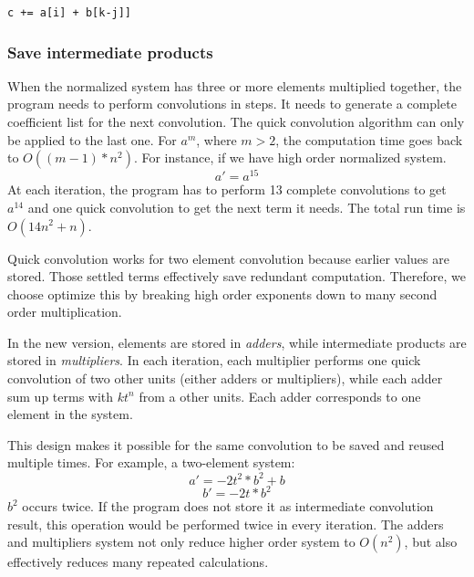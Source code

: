 \documentclass[12pt]{article}
\begin{document}
\begin{algorithmic}
   \State \texttt{c += a[i] + b[k-j]]}
\EndFor
\end{algorithmic}

\subsubsection{Save intermediate products}
When the normalized system has three or more elements multiplied together, the program needs to perform convolutions in steps. It needs to generate a complete coefficient list for the next convolution. The quick convolution algorithm can only be applied to the last one. For $a^{m}$, where $m>2$, the computation time goes back to $O((m-1)*n^2)$.
For instance, if we have high order normalized system.
\begin{equation}
a' = a^{15}
\end{equation}
At each iteration, the program has to perform 13 complete convolutions to get $a^{14}$ and one quick convolution to get the next term it needs. The total run time is $O(14n^{2}+n)$.

Quick convolution works for two element convolution because earlier values are stored. Those settled terms effectively save redundant computation. Therefore, we choose optimize this by breaking high order exponents down to many second order multiplication.

In the new version, elements are stored in {\it adders}, while intermediate products are stored in {\it multipliers}. In each iteration, each multiplier performs one quick convolution of two other units (either adders or multipliers), while each adder sum up terms with $kt^{n}$ from a other units. Each adder corresponds to one element in the system.

This design makes it possible for the same convolution to be saved and reused multiple times. For example, a two-element system: 
\begin{equation}
a' = - 2t^{2}*b^{2} + b
\end{equation}
\begin{equation}
b' = - 2t*b^{2}
\end{equation}
$b^{2}$ occurs twice. If the program does not store it as intermediate convolution result, this operation would be performed twice in every iteration. The adders and multipliers system not only reduce higher order system to $O(n^{2})$, but also effectively reduces many repeated calculations.
\end{document}
